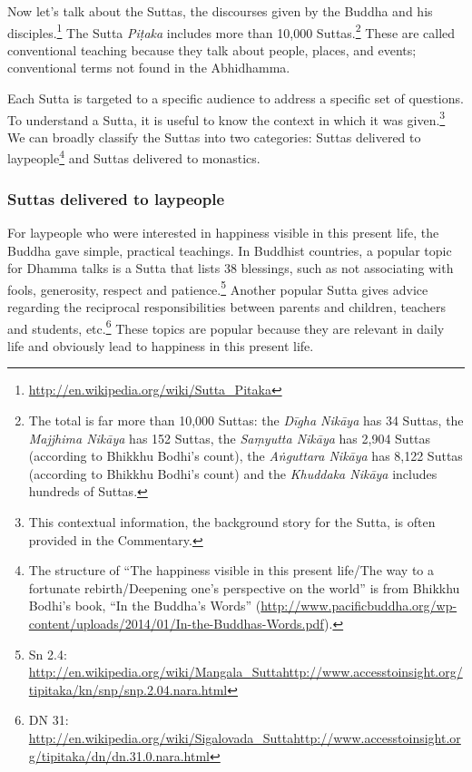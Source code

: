 Now let’s talk about the Suttas, the discourses given by the Buddha and his disciples.\footnote{\url{http://en.wikipedia.org/wiki/Sutta_Pitaka}} The Sutta \textit{Piṭaka} includes more than 10,000 Suttas.\footnote{The total is far more than 10,000 Suttas: the \textit{Dīgha Nikāya} has 34 Suttas, the \textit{Majjhima Nikāya} has 152 Suttas, the \textit{Saṃyutta Nikāya} has 2,904 Suttas (according to Bhikkhu Bodhi’s count), the \textit{Aṅguttara Nikāya} has 8,122 Suttas (according to Bhikkhu Bodhi’s count) and the \textit{Khuddaka Nikāya} includes hundreds of Suttas.} These are called conventional teaching because they talk about people, places, and events; conventional terms not found in the Abhidhamma.

Each Sutta is targeted to a specific audience to address a specific set of questions. To understand a Sutta, it is useful to know the context in which it was given.\footnote{This contextual information, the background story for the Sutta, is often provided in the Commentary.} We can broadly classify the Suttas into two categories: Suttas delivered to laypeople\footnote{The structure of “The happiness visible in this present life/The way to a fortunate rebirth/Deepening one’s perspective on the world” is from Bhikkhu Bodhi’s book, “In the Buddha’s Words” (\url{http://www.pacificbuddha.org/wp-content/uploads/2014/01/In-the-Buddhas-Words.pdf}).} and Suttas delivered to monastics.

\subsubsection*{Suttas delivered to laypeople}

For laypeople who were interested in happiness visible in this present life, the Buddha gave simple, practical teachings. In Buddhist countries, a popular topic for Dhamma talks is a Sutta that lists 38 blessings, such as not associating with fools, generosity, respect and patience.\footnote{Sn 2.4: \url{http://en.wikipedia.org/wiki/Mangala_Sutta}\newline \url{http://www.accesstoinsight.org/tipitaka/kn/snp/snp.2.04.nara.html}} Another popular Sutta gives advice regarding the reciprocal responsibilities between parents and children, teachers and students, etc.\footnote{DN 31: \url{http://en.wikipedia.org/wiki/Sigalovada_Sutta}\newline \url{http://www.accesstoinsight.org/tipitaka/dn/dn.31.0.nara.html}} These topics are popular because they are relevant in daily life and obviously lead to happiness in this present life.

